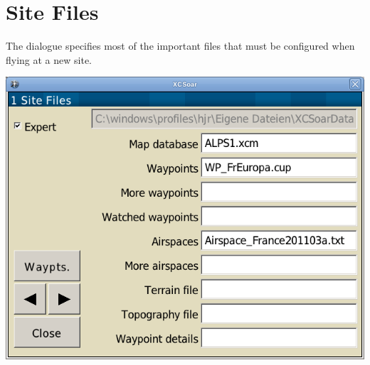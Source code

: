 

\clearpage
\section{Site Files}
The dialogue specifies most of the important files that must be
configured when flying at a new site.

\begin{center}
\includegraphics[angle=0,width=0.8\linewidth,keepaspectratio='true']{figures/config-site.png}
\end{center}

